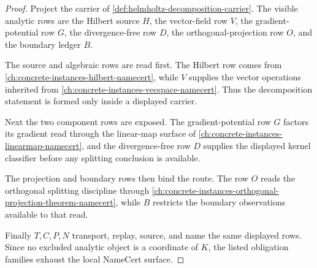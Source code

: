 \begin{proof}
Project the carrier of \autoref{def:helmholtz-decomposition-carrier}. The visible analytic rows are the Hilbert source $H$, the vector-field row $V$, the gradient-potential row $G$, the divergence-free row $D$, the orthogonal-projection row $O$, and the boundary ledger $B$.

The source and algebraic rows are read first. The Hilbert row comes from \autoref{ch:concrete-instances-hilbert-namecert}, while $V$ supplies the vector operations inherited from \autoref{ch:concrete-instances-vecspace-namecert}. Thus the decomposition statement is formed only inside a displayed carrier.

Next the two component rows are exposed. The gradient-potential row $G$ factors its gradient read through the linear-map surface of \autoref{ch:concrete-instances-linearmap-namecert}, and the divergence-free row $D$ supplies the displayed kernel classifier before any splitting conclusion is available.

The projection and boundary rows then bind the route. The row $O$ reads the orthogonal splitting discipline through \autoref{ch:concrete-instances-orthogonal-projection-theorem-namecert}, while $B$ restricts the boundary observations available to that read.

Finally $T,C,P,N$ transport, replay, source, and name the same displayed rows. Since no excluded analytic object is a coordinate of $K$, the listed obligation families exhaust the local NameCert surface.
\end{proof}

